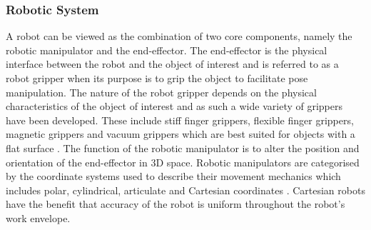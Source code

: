 %
%

\subsubsection{Robotic System}


A robot can be viewed as the combination of two core components, namely the robotic manipulator and the end-effector. The end-effector is the physical interface between the robot and the object of interest and is referred to as a robot gripper when its purpose is to grip the object to facilitate pose manipulation. The nature of the robot gripper depends on the physical characteristics of the object of interest and as such a wide variety of grippers have been developed. These include stiff finger grippers, flexible finger grippers, magnetic grippers and vacuum grippers which are best suited for objects with a flat surface \cite{Lundstrom:Industrial_Robot_Grippers}. The function of the robotic manipulator is to alter the position and orientation of the end-effector in 3D space. Robotic manipulators are categorised by the coordinate systems used to describe their movement mechanics which includes polar, cylindrical, articulate and Cartesian coordinates \cite{Miller:Robots_and_Robotics_Principles}. Cartesian robots have the benefit that accuracy of the robot is uniform throughout the robot's work envelope.

